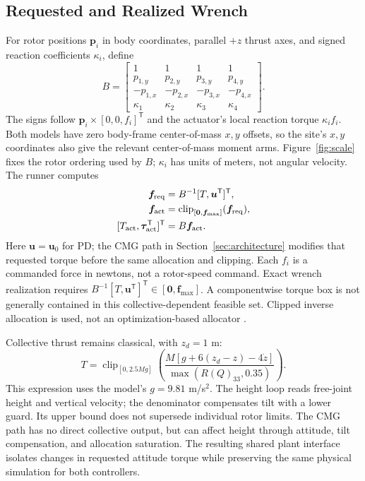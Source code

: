 \documentclass[letterpaper,10pt,conference]{IEEEtran}
\newcommand{\T}{^{\mathsf T}}
\newcommand{\clip}{\operatorname{clip}}
\begin{document}
\subsection{Requested and Realized Wrench}
For rotor positions $\bm p_i$ in body coordinates, parallel $+z$ thrust
axes, and signed reaction coefficients $\kappa_i$, define
\begin{equation}
 B=\begin{bmatrix}
 1&1&1&1\\p_{1,y}&p_{2,y}&p_{3,y}&p_{4,y}\\
 -p_{1,x}&-p_{2,x}&-p_{3,x}&-p_{4,x}\\
 \kappa_1&\kappa_2&\kappa_3&\kappa_4
 \end{bmatrix}.
 \label{eq:allocationmatrix}
\end{equation}
The signs follow $\bm p_i\times[0,0,f_i]\T$ and the actuator's local
reaction torque $\kappa_i f_i$. Both models have zero body-frame
center-of-mass $x,y$ offsets, so the site's $x,y$ coordinates also give
the relevant center-of-mass moment arms. Figure~\ref{fig:scale} fixes the
rotor ordering used by $B$; $\kappa_i$ has units of meters, not angular
velocity. The runner computes
\begin{equation}
 \begin{aligned}
 \bm f_{\rm req}&=B^{-1}[T,\bm u\T]\T,\\
 \bm f_{\rm act}&=\clip_{[\bm0,\bm f_{\max}]}(\bm f_{\rm req}),\\
 [T_{\rm act},\bm\tau_{\rm act}\T]\T&=B\bm f_{\rm act}.
 \end{aligned}
 \label{eq:mixer}
\end{equation}
Here $\bm u=\bm u_0$ for PD; the CMG path in Section~\ref{sec:architecture}
modifies that requested torque before the same allocation and clipping.
Each $f_i$ is a commanded force in newtons, not a rotor-speed command.
Exact wrench realization requires
$B^{-1}[T,\bm u\T]\T\in[\bm0,\bm f_{\max}]$.
A componentwise torque box is not generally contained in this
collective-dependent feasible set. Clipped inverse allocation is used,
not an optimization-based allocator \cite{monteiro2016allocation}.

Collective thrust remains classical, with $z_d=1$ m:
\begin{equation}
 T=\clip_{[0,2.5Mg]}
 \left(\frac{M[g+6(z_d-z)-4\dot z]}{\max(R(Q)_{33},0.35)}\right).
 \label{eq:collective}
\end{equation}
This expression uses the model's $g=9.81$ m/s$^2$. The height loop reads
free-joint height and vertical velocity; the denominator compensates tilt
with a lower guard. Its upper bound does not supersede individual rotor
limits. The CMG path has no direct collective output, but can affect
height through attitude, tilt compensation, and allocation saturation.
The resulting shared plant interface isolates changes in requested
attitude torque while preserving the same physical simulation for both
controllers.
\end{document}
